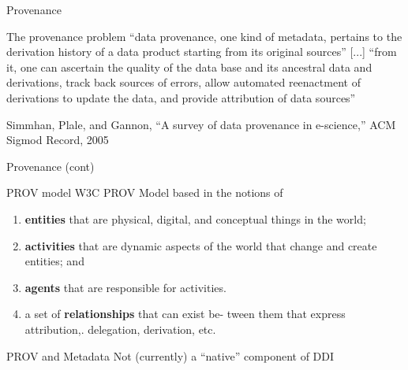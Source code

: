 \begin{frame}{Provenance}
	\begin{block}{The provenance problem}
		``data provenance, one kind of metadata, pertains to the derivation history of a
		data product starting from its original sources'' [...]  ``from it, one can ascertain
		the quality of the data base and its ancestral data and derivations, track back sources
		of errors, allow automated reenactment of derivations to update the data, and provide 
		attribution of data sources'' 
	\end{block}
	{\tiny Simmhan, Plale, and Gannon, ``A survey of data provenance in e-science,'' ACM Sigmod Record, 2005}
\end{frame}


\begin{frame}{Provenance (cont)}
	\begin{block}{PROV model}
		W3C PROV Model  based in the notions of 
		\begin{enumerate}
			\item \textbf{entities} that are physical, digital, and conceptual
			things in the world; 
			\item \textbf{activities} that are dynamic aspects of the world that change and
			create entities; and 
			\item \textbf{agents} that are responsible for activities. 
			\item  a set of \textbf{relationships} that can exist be-
			tween them that express attribution,. delegation, derivation, etc.
		\end{enumerate}
	\end{block}
	\begin{block}{PROV and Metadata}
		Not (currently) a ``native'' component of DDI
	\end{block}
\end{frame}

%


